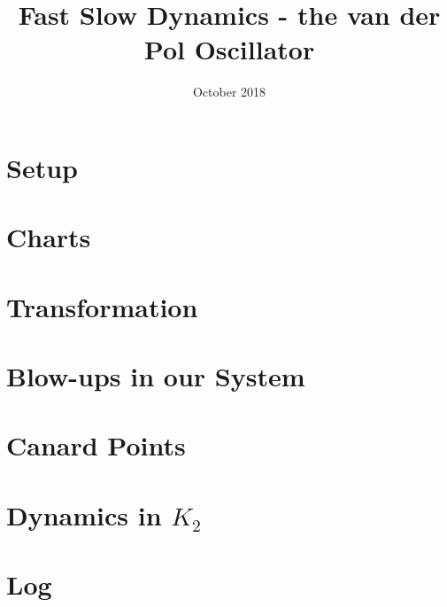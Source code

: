 \documentclass{article}
\title{Fast Slow Dynamics - the van der Pol Oscillator}
\author{}
\date{October 2018}
\begin{document}
\maketitle

\section{Setup}



\section{Charts}\label{sec: charts}


\section{Transformation}


\section{Blow-ups in our System}\label{sec: VDP Blowup}


\section{Canard Points}

\newpage
\appendix
\section{Dynamics in \texorpdfstring{$K_2$}{K2}}

\newpage


\nocite{strogatz2007nonlinear}
\appendix
\section{Log}
\end{document}
